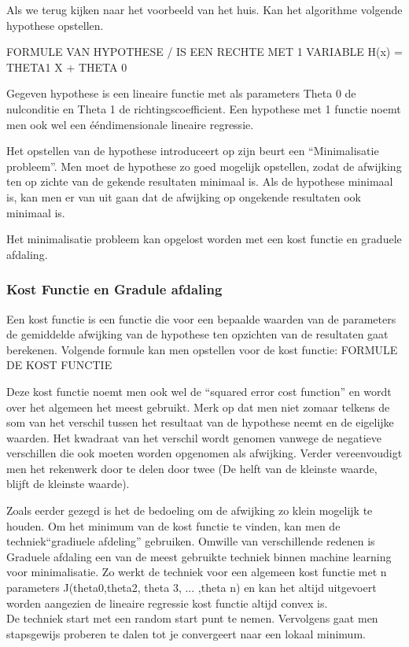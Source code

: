 Als we terug kijken naar het voorbeeld van het huis. Kan het algorithme volgende hypothese opstellen.

\newline 
FORMULE VAN HYPOTHESE / IS EEN RECHTE MET 1 VARIABLE H(x) = THETA1 X + THETA 0
\newline

Gegeven hypothese is een lineaire functie met als parameters Theta 0 de nulconditie en Theta 1 de richtingscoefficient. Een hypothese met 1 functie noemt men ook wel een ééndimensionale lineaire regressie.

\newline

Het opstellen van de hypothese introduceert op zijn beurt een ``Minimalisatie probleem''. Men moet de hypothese zo goed mogelijk opstellen, zodat de afwijking ten op zichte van de gekende resultaten minimaal is. Als de hypothese minimaal is, kan men er van uit gaan dat de afwijking op ongekende resultaten ook minimaal is.

Het minimalisatie probleem kan opgelost worden met een kost functie en graduele afdaling.

\subsubsection{Kost Functie en Gradule afdaling}\label{Kost Functie en Gradule afdaling}

Een kost functie is een functie die voor een bepaalde waarden van de parameters de gemiddelde afwijking van de hypothese ten opzichten van de resultaten gaat berekenen. Volgende formule kan men opstellen voor de kost functie:
\newline
\newline
FORMULE DE KOST FUNCTIE
\newline

Deze kost functie noemt men ook wel de ``squared error cost function'' en wordt over het algemeen het meest gebruikt. 
Merk op dat men niet zomaar telkens de som van het verschil tussen het resultaat van de hypothese neemt en de eigelijke waarden. Het kwadraat van het verschil wordt genomen vanwege de negatieve verschillen die ook moeten worden opgenomen als afwijking. Verder vereenvoudigt men het rekenwerk door te delen door twee (De helft van de kleinste waarde, blijft de kleinste waarde). 

Zoals eerder gezegd is het de bedoeling om de afwijking zo klein mogelijk te houden. Om het minimum van de kost functie te vinden, kan men de techniek``gradiuele afdeling'' gebruiken. Omwille van verschillende redenen is Graduele afdaling een van de meest gebruikte techniek binnen machine learning voor minimalisatie. Zo werkt de techniek voor een algemeen kost functie met n parameters J(theta0,theta2, theta 3, ... ,theta n) en kan het altijd uitgevoert worden aangezien de lineaire regressie kost functie altijd convex is.
\\
De techniek start met een random start punt te nemen. Vervolgens gaat men stapsgewijs proberen te dalen tot je convergeert naar een lokaal minimum.

